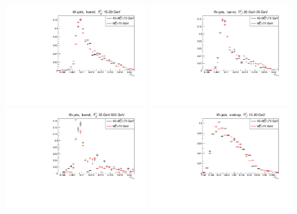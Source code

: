\begin{figure}[htb]
  \begin{center}
  \includegraphics[width=0.48\textwidth]{../figs/figs_v11/MUON_WGamma/QuickChecks/cTemplatesVsWMt_Wjets_phoSigmaIEtaIEta_BARREL_pt15to20.pdf} \includegraphics[width=0.48\textwidth]{../figs/figs_v11/MUON_WGamma/QuickChecks/cTemplatesVsWMt_Wjets_phoSigmaIEtaIEta_BARREL_pt20to35.pdf} \\
  \includegraphics[width=0.48\textwidth]{../figs/figs_v11/MUON_WGamma/QuickChecks/cTemplatesVsWMt_Wjets_phoSigmaIEtaIEta_BARREL_pt35to500.pdf}  \includegraphics[width=0.48\textwidth]{../figs/figs_v11/MUON_WGamma/QuickChecks/cTemplatesVsWMt_Wjets_phoSigmaIEtaIEta_ENDCAP_pt15to20.pdf} \\

\end{center}
\end{figure}
